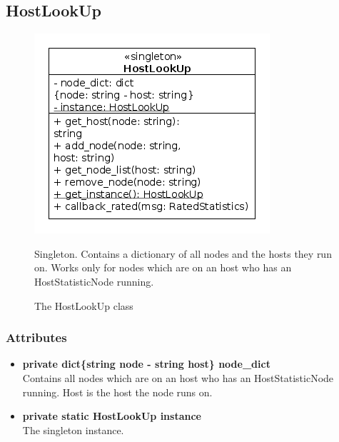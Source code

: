 \newpage
\subsection{HostLookUp}
\begin{figure}[htbp]
	\begin{minipage}[t]{8cm}
		\vspace{0pt}
		\centering
		\includegraphics[scale=0.6]{./diagram_pictures/reactor/HostLookUp.png}
		\caption{The HostLookUp class}
	\end{minipage}
	\hfill
	\begin{minipage}[t]{8cm}
		\vspace{10pt}
			Singleton. Contains a dictionary of all nodes and the hosts they run on. Works only for nodes which are on an host who has an HostStatisticNode running.
	\end{minipage}
\end{figure}  


\subsubsection{Attributes}
\begin{itemize}
	\item \textbf{ private dict\{string node - string host\} node\_dict }\\
		Contains all nodes which are on an host who has an HostStatisticNode running. Host is the host the node runs on.
	\item \textbf{ private static HostLookUp instance }\\
		The singleton instance.
\end{itemize}
